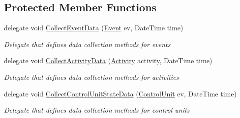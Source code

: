 \subsection*{Protected Member Functions}
\begin{DoxyCompactItemize}
\item 
delegate void \hyperlink{class_simulation_core_1_1_model_log_1_1_generic_output_genereator_ada813b048eeac074d6d84668d33f384e}{Collect\+Event\+Data} (\hyperlink{class_simulation_core_1_1_h_c_c_m_elements_1_1_event}{Event} ev, Date\+Time time)
\begin{DoxyCompactList}\small\item\em Delegate that defines data collection methods for events \end{DoxyCompactList}\item 
delegate void \hyperlink{class_simulation_core_1_1_model_log_1_1_generic_output_genereator_a0270699b86c929ca3021962550625514}{Collect\+Activity\+Data} (\hyperlink{class_simulation_core_1_1_h_c_c_m_elements_1_1_activity}{Activity} activity, Date\+Time time)
\begin{DoxyCompactList}\small\item\em Delegate that defines data collection methods for activities \end{DoxyCompactList}\item 
delegate void \hyperlink{class_simulation_core_1_1_model_log_1_1_generic_output_genereator_a41bcb68889385d00be690756a3d60b80}{Collect\+Control\+Unit\+State\+Data} (\hyperlink{class_simulation_core_1_1_h_c_c_m_elements_1_1_control_unit}{Control\+Unit} ev, Date\+Time time)
\begin{DoxyCompactList}\small\item\em Delegate that defines data collection methods for control units \end{DoxyCompactList}\end{DoxyCompactItemize}
